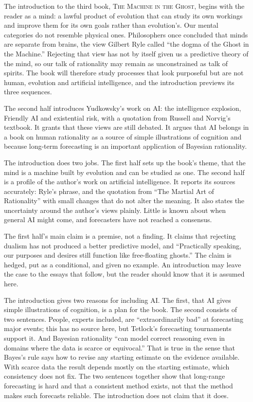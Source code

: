 \begin{afterword}
\summaryhead

The introduction to the third book, \textsc{The Machine in the Ghost}, begins with the reader as a mind: a lawful product of evolution that can study its own workings and improve them for its own goals rather than evolution's. Our mental categories do not resemble physical ones. Philosophers once concluded that minds are separate from brains, the view Gilbert Ryle called ``the dogma of the Ghost in the Machine.'' Rejecting that view has not by itself given us a predictive theory of the mind, so our talk of rationality may remain as unconstrained as talk of spirits. The book will therefore study processes that look purposeful but are not human, evolution and artificial intelligence, and the introduction previews its three sequences.

The second half introduces Yudkowsky's work on AI: the intelligence explosion, Friendly AI and existential risk, with a quotation from Russell and Norvig's textbook. It grants that these views are still debated. It argues that AI belongs in a book on human rationality as a source of simple illustrations of cognition and because long-term forecasting is an important application of Bayesian rationality.

\responsehead

The introduction does two jobs. The first half sets up the book's theme, that the mind is a machine built by evolution and can be studied as one. The second half is a profile of the author's work on artificial intelligence. It reports its sources accurately: Ryle's phrase, and the quotation from ``The Martial Art of Rationality'' with small changes that do not alter the meaning. It also states the uncertainty around the author's views plainly. Little is known about when general AI might come, and forecasters have not reached a consensus.

The first half's main claim is a premise, not a finding. It claims that rejecting dualism has not produced a better predictive model, and ``Practically speaking, our purposes and desires still function like free-floating ghosts.'' The claim is hedged, put as a conditional, and given no example. An introduction may leave the case to the essays that follow, but the reader should know that it is assumed here.

The introduction gives two reasons for including AI. The first, that AI gives simple illustrations of cognition, is a plan for the book. The second consists of two sentences. People, experts included, are ``extraordinarily bad'' at forecasting major events; this has no source here, but Tetlock's forecasting tournaments support it. And Bayesian rationality ``can model correct reasoning even in domains where the data is scarce or equivocal.'' That is true in the sense that Bayes's rule says how to revise any starting estimate on the evidence available. With scarce data the result depends mostly on the starting estimate, which consistency does not fix. The two sentences together show that long-range forecasting is hard and that a consistent method exists, not that the method makes such forecasts reliable. The introduction does not claim that it does.


\end{afterword}
